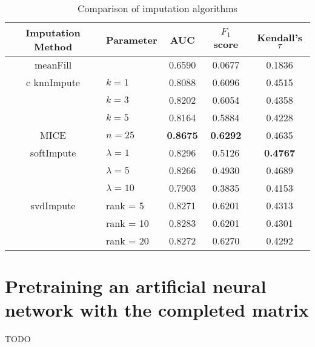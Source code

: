 \begin{table}[htbp]
\centering
\begin{tabular}{cl||ccc}
\toprule
Imputation Method & Parameter & AUC & $F_1$ score & Kendall's $\tau$ \\
\midrule 
meanFill &   & 0.6590  & 0.0677 & 0.1836 \\
\midrule c
knnImpute & $k = 1$ & 0.8088 & 0.6096 & 0.4515\\
  & $k = 3$ & 0.8202 & 0.6054 & 0.4358 \\
  & $k = 5$ & 0.8164 & 0.5884 & 0.4228 \\
\midrule
MICE & $n = 25$ & \bf{0.8675} & \bf{0.6292} & 0.4635 \\
\midrule
softImpute & $\lambda=1$ & 0.8296 & 0.5126 & \bf{0.4767} \\
& $\lambda=5$ & 0.8266 & 0.4930 & 0.4689 \\
& $\lambda=10$ & 0.7903 & 0.3835 & 0.4153 \\
\midrule
svdImpute & rank = 5 & 0.8271 & 0.6201 & 0.4313 \\
& rank = 10 & 0.8283 & 0.6201 & 0.4301 \\
& rank = 20 & 0.8272 & 0.6270 & 0.4292  \\
\bottomrule[1.25pt]
\end{tabular}
\begin{center}
\caption{Comparison of imputation algorithms}
\end{center}
\end{table}

\section*{Pretraining an artificial neural network with the completed matrix}

TODO
